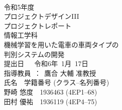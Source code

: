 
\begin{titlepage}
 \begin{center}
  ~\\
  \vspace{1cm}
  {\Large 
  令和5年度\\
 プロジェクトデザインIII\\
  プロジェクトレポート\\
情報工学科\\}
  \vspace{1.3in}
  {\Huge \gtfamily
機械学習を用いた電車の車両タイプの\\
判別システムの開発\\
  }
  \vspace{2in}
  {\LARGE 
  提出日~~~令和6年~1月~17日\\
  \vspace{0.4in}
  指導教員~：~鷹合 大輔 准教授\\
 \vspace{0.9in}
  氏名　学籍番号 (クラス--名列番号)\\
  \vspace{2mm}
  野崎 悠度　1936463 (4EP1--68)\\
  田村 優祐　1936119 (4EP4--75)\\
  }
 \end{center}
\end{titlepage}
